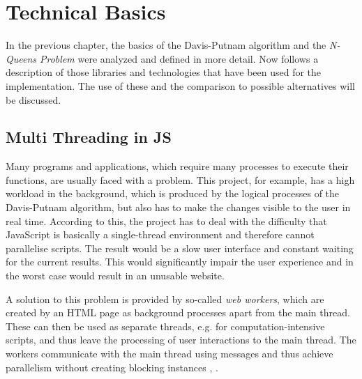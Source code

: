 

\chapter{Technical Basics}
\label{ch:tecBasics}
In the previous chapter, the basics of the Davis-Putnam algorithm and the \textit{N-Queens Problem} were analyzed and defined in more detail. Now follows a description of those libraries and technologies that have been used for the implementation. The use of these and the comparison to possible alternatives will be discussed. 

\section{Multi Threading in JS}
\label{sec:tecWorker}
Many programs and applications, which require many processes to execute their functions, are usually faced with a problem. This project, for example, has a high workload in the background, which is produced by the logical processes of the Davis-Putnam algorithm, but also has to make the changes visible to the user in real time. According to this, the project has to deal with the difficulty that JavaScript is basically a single-thread environment and therefore cannot parallelise scripts. The result would be a slow user interface and constant waiting for the current results. This would significantly impair the user experience and in the worst case would result in an unusable website.

A solution to this problem is provided by so-called \emph{web workers}, which are created by an HTML page as background processes apart from the main thread. These can then be used as separate threads, e.g. for computation-intensive scripts, and thus leave the processing of user interactions to the main thread. The workers communicate with the main thread using messages and thus achieve parallelism without creating blocking instances \cite{Peng2017}, \cite{Bidelman2010}. 


